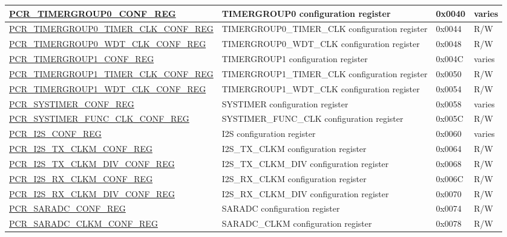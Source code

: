 \begin{longtable}{ | p{7cm} | p{6.2cm} | p{1.3cm} | p{1cm} | }
\hyperref[regdesc:PCRTIMERGROUP0CONFREG]{PCR\_TIMERGROUP0\_CONF\_REG} & TIMERGROUP0 configuration register & 0x0040 & varies \\ \hline
\hyperref[regdesc:PCRTIMERGROUP0TIMERCLKCONFREG]{PCR\_TIMERGROUP0\_TIMER\_CLK\_CONF\_REG} & TIMERGROUP0\_TIMER\_CLK configuration register & 0x0044 & R/W \\ \hline
\hyperref[regdesc:PCRTIMERGROUP0WDTCLKCONFREG]{PCR\_TIMERGROUP0\_WDT\_CLK\_CONF\_REG} & TIMERGROUP0\_WDT\_CLK configuration register & 0x0048 & R/W \\ \hline
\hyperref[regdesc:PCRTIMERGROUP1CONFREG]{PCR\_TIMERGROUP1\_CONF\_REG} & TIMERGROUP1 configuration register & 0x004C & varies \\ \hline
\hyperref[regdesc:PCRTIMERGROUP1TIMERCLKCONFREG]{PCR\_TIMERGROUP1\_TIMER\_CLK\_CONF\_REG} & TIMERGROUP1\_TIMER\_CLK configuration register & 0x0050 & R/W \\ \hline
\hyperref[regdesc:PCRTIMERGROUP1WDTCLKCONFREG]{PCR\_TIMERGROUP1\_WDT\_CLK\_CONF\_REG} & TIMERGROUP1\_WDT\_CLK configuration register & 0x0054 & R/W \\ \hline
\hyperref[regdesc:PCRSYSTIMERCONFREG]{PCR\_SYSTIMER\_CONF\_REG} & SYSTIMER configuration register & 0x0058 & varies \\ \hline
\hyperref[regdesc:PCRSYSTIMERFUNCCLKCONFREG]{PCR\_SYSTIMER\_FUNC\_CLK\_CONF\_REG} & SYSTIMER\_FUNC\_CLK configuration register & 0x005C & R/W \\ \hline
\hyperref[regdesc:PCRI2SCONFREG]{PCR\_I2S\_CONF\_REG} & I2S configuration register & 0x0060 & varies \\ \hline
\hyperref[regdesc:PCRI2STXCLKMCONFREG]{PCR\_I2S\_TX\_CLKM\_CONF\_REG} & I2S\_TX\_CLKM configuration register & 0x0064 & R/W \\ \hline
\hyperref[regdesc:PCRI2STXCLKMDIVCONFREG]{PCR\_I2S\_TX\_CLKM\_DIV\_CONF\_REG} & I2S\_TX\_CLKM\_DIV configuration register & 0x0068 & R/W \\ \hline
\hyperref[regdesc:PCRI2SRXCLKMCONFREG]{PCR\_I2S\_RX\_CLKM\_CONF\_REG} & I2S\_RX\_CLKM configuration register & 0x006C & R/W \\ \hline
\hyperref[regdesc:PCRI2SRXCLKMDIVCONFREG]{PCR\_I2S\_RX\_CLKM\_DIV\_CONF\_REG} & I2S\_RX\_CLKM\_DIV configuration register & 0x0070 & R/W \\ \hline
\hyperref[regdesc:PCRSARADCCONFREG]{PCR\_SARADC\_CONF\_REG} & SARADC configuration register & 0x0074 & R/W \\ \hline
\hyperref[regdesc:PCRSARADCCLKMCONFREG]{PCR\_SARADC\_CLKM\_CONF\_REG} & SARADC\_CLKM configuration register & 0x0078 & R/W \\ \hline

\end{longtable}
